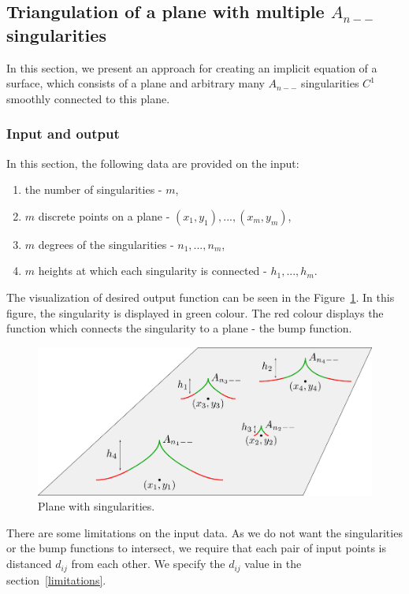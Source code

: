 \subsection{Triangulation of a plane with multiple $A_{n--}$ singularities}
In this section, we present an approach for creating an implicit equation of a
surface, which consists of a plane and arbitrary many $A_{n--}$ singularities
$C^1$ smoothly connected to this plane. 
\subsubsection*{Input and output}
In this section, the following data are provided on the input:
\begin{enumerate}
    \item the number of singularities - $m$,
    \item $m$ discrete points on a plane - $(x_1, y_1), ..., (x_m, y_m)$,
    \item $m$ degrees of the singularities - $n_1, ..., n_m$,
    \item $m$ heights at which each singularity is connected - $h_1, ..., h_m$.
\end{enumerate}
The visualization of desired output function can be seen in the Figure~\ref{img:22}. 
In this figure, the singularity is displayed in green colour. The red colour displays the function which connects the singularity to a plane - the bump function.
\begin{figure}
    \centerline{\includegraphics[scale=0.5]{images/img22}}
    \caption[Plane with singularities.]
    {Plane with singularities.}
    \label{img:22}
\end{figure}
There are some limitations on the input data. As we do not want the singularities 
or the bump functions to intersect, we require that each pair of input points is
distanced $d_{ij}$ from each other. We specify the $d_{ij}$ value in the section~\ref{limitations}.
